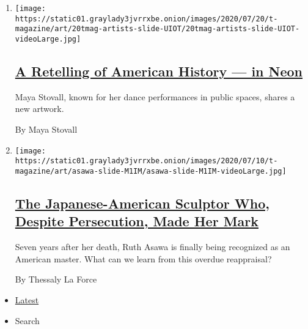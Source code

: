 \begin{enumerate}
\def\labelenumi{\arabic{enumi}.}
\item
  \texttt{[image: https://static01.graylady3jvrrxbe.onion/images/2020/07/20/t-magazine/art/20tmag-artists-slide-UIOT/20tmag-artists-slide-UIOT-videoLarge.jpg]}

  \hypertarget{a-retelling-of-american-history--in-neon}{%
  \subsection{\texorpdfstring{\href{/2020/07/20/t-magazine/maya-stovall.html}{A
  Retelling of American History --- in
  Neon}}{A Retelling of American History --- in Neon}}\label{a-retelling-of-american-history--in-neon}}

  Maya Stovall, known for her dance performances in public spaces,
  shares a new artwork.

  By Maya Stovall
\item
  \texttt{[image: https://static01.graylady3jvrrxbe.onion/images/2020/07/10/t-magazine/art/asawa-slide-M1IM/asawa-slide-M1IM-videoLarge.jpg]}

  \hypertarget{the-japanese-american-sculptor-who-despite-persecution-made-her-mark}{%
  \subsection{\texorpdfstring{\href{/2020/07/20/t-magazine/ruth-asawa.html}{The
  Japanese-American Sculptor Who, Despite Persecution, Made Her
  Mark}}{The Japanese-American Sculptor Who, Despite Persecution, Made Her Mark}}\label{the-japanese-american-sculptor-who-despite-persecution-made-her-mark}}

  Seven years after her death, Ruth Asawa is finally being recognized as
  an American master. What can we learn from this overdue reappraisal?

  By Thessaly La Force
\end{enumerate}

\begin{itemize}
\tightlist
\item
  \protect\hyperlink{stream-panel}{Latest}
\item
  Search
\end{itemize}

